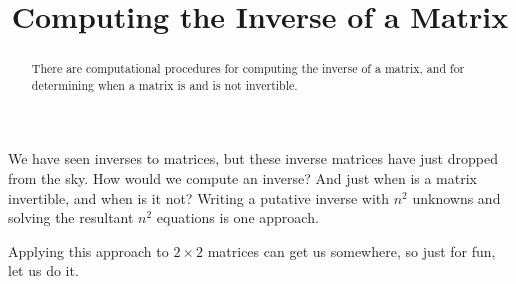 \documentclass{ximera}
\title{Computing the Inverse of a Matrix}
\begin{document}
\begin{abstract}
  There are computational procedures for computing the inverse of a
  matrix, and for determining when a matrix is and is not invertible.
\end{abstract}
\maketitle

We have seen inverses to matrices, but these inverse matrices have
just dropped from the sky.  How would we compute an inverse?  And just
when is a matrix invertible, and when is it not?  Writing a putative
inverse with $n^2$ unknowns and solving the resultant $n^2$ equations
is one approach.

Applying this approach to $2\times 2$ matrices can get us somewhere,
so just for fun, let us do it.
\end{document}
